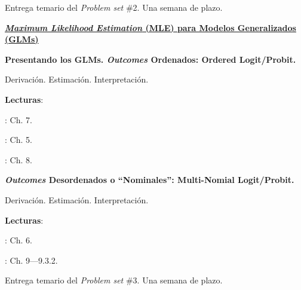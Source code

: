 \documentclass[letterpaper]{article}
\renewenvironment{itemize}{
  \begin{list}{}{
    \setlength{\leftmargin}{1.5em}
  }
}{
  \end{list}
}
\begin{document}
\begin{enumerate}[label=\roman*.]
\item[{\color{red}\Pointinghand}] Entrega temario del \emph{Problem set} \#2. Una semana de plazo.


\item {\bf{\color{ForestGreen}\underline{\emph{Maximum Likelihood Estimation} (MLE) para Modelos Generalizados (GLMs)}}}

       \begin{itemize} 
        \item[15.] {\bf Presentando los GLMs. \emph{Outcomes} Ordenados: Ordered Logit/Probit.}
        \begin{itemize} 
          \item[$\circ$] Derivaci\'on. Estimaci\'on. Interpretaci\'on.
          \item[$\circ$] {\bf Lecturas}: 
            \begin{itemize} 
              \item[$\diamond$] \textcite{Ward2018}: Ch. 7. 
              \item[$\diamond$] \textcite{Long2001}: Ch. 5.
              \item[$\diamond$] \textcite{Ward2018}: Ch. 8. 
            \end{itemize}
        \end{itemize}
      \end{itemize}



       \begin{itemize} 
        \item[16.] {\bf \emph{Outcomes} Desordenados o ``Nominales'': Multi-Nomial Logit/Probit.}
        \begin{itemize} 
          \item[$\circ$] Derivaci\'on. Estimaci\'on. Interpretaci\'on.
          \item[$\circ$] {\bf Lecturas}: 
            \begin{itemize} 
              \item[$\diamond$] \textcite{Long2001}: Ch. 6.
              \item[$\diamond$] \textcite{Ward2018}: Ch. 9---9.3.2.
            \end{itemize}
        \end{itemize}
      \end{itemize}



\item[{\color{red}\Pointinghand}] Entrega temario del \emph{Problem set} \#3. Una semana de plazo.




\end{enumerate}
\end{document}
